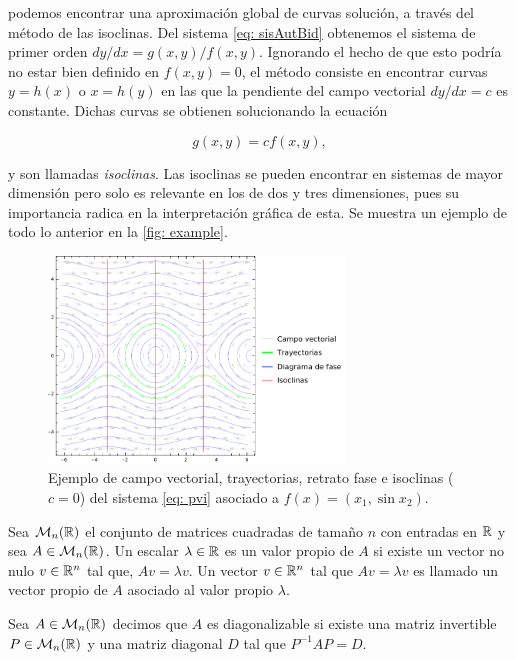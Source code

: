 podemos encontrar una aproximación global de curvas solución, a través del método de las isoclinas. Del sistema \eqref{eq: sisAutBid} obtenemos el sistema de primer orden $dy/dx = g(x, y)/f(x, y)$. Ignorando el hecho de que esto podría no estar bien definido en $f(x, y) = 0$, el método consiste en encontrar curvas $y=h(x)$ o $x=h(y)$ en las que la pendiente del campo vectorial $dy/dx = c$ es constante. Dichas curvas se obtienen solucionando la ecuación

\begin{equation}
	g(x, y) = cf(x, y),
	\label{eq: pendiente}
\end{equation}

y son llamadas \textit{isoclinas}. Las isoclinas se pueden encontrar en sistemas de mayor dimensión pero solo es relevante en los de dos y tres dimensiones, pues su importancia radica en la interpretación gráfica de esta. Se muestra un ejemplo de todo lo anterior en la \autoref{fig: example}.

\begin{figure}
	\centering
	\includegraphics[width=0.7\textwidth]{img/Example.pdf}
	\caption{Ejemplo de campo vectorial, trayectorias, retrato fase e isoclinas ($c=0$) del sistema \eqref{eq: pvi} asociado a $f(x)=(x_{1},\sin{x_{2}})$.}
	\label{fig: example}
\end{figure}

\begin{defi}
	Sea $\mathcal{M}_{n}({\mathbb{R}})$ el conjunto de matrices cuadradas de tamaño $n$ con entradas en ${\mathbb{R}}$ y sea $A \in \mathcal{M}_{n}({\mathbb{R}})$. Un escalar $\lambda \in {\mathbb{R}}$ es un valor propio de $A$ si existe un vector no nulo $v \in {\mathbb{R}}^{n}$ tal que, $Av = \lambda v$. Un vector $v \in {\mathbb{R}}^{n}$ tal que $Av = \lambda v$ es llamado un vector propio de $A$ asociado al valor propio $\lambda$.
\end{defi}

\begin{defi}
	Sea $A \in \mathcal{M}_{n}({\mathbb{R}})$ decimos que $A$ es diagonalizable si existe una matriz invertible $P \in \mathcal{M}_{n}({\mathbb{R}})$ y una matriz diagonal $D$ tal que $P^{-1}AP = D$.
\end{defi}

